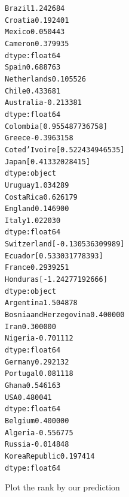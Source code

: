 \documentclass[letterpaper,10pt,english]{/usr/local/lib/python2.7/dist-packages/sphinx/texinputs/sphinxhowto}
\newenvironment{InvisibleVerbatim}
        {\begin{mdframed}[leftmargin=0.1\linewidth,innerleftmargin=3pt,innerrightmargin=3pt, userdefinedwidth=1\linewidth, linewidth=0pt, linecolor=white, usetwoside=false]}
        {\end{mdframed}}
\begin{document}
    

        
        

            
                \begin{InvisibleVerbatim}
                \vspace{-0.5\baselineskip}
\begin{alltt}Brazil     1.242684
Croatia    0.192401
Mexico     0.050443
Cameron    0.379935
dtype: float64
Spain          0.688763
Netherlands    0.105526
Chile          0.433681
Australia     -0.213381
dtype: float64
Colombia         [0.955487736758]
Greece                 -0.3963158
Cote d'Ivoire    [0.522434946535]
Japan             [0.41332028415]
dtype: object
Uruguay       1.034289
Costa Rica    0.626179
England       0.146900
Italy         1.022030
dtype: float64
Switzerland    [-0.130536309989]
Ecuador         [0.533031778393]
France                 0.2939251
Honduras        [-1.24277192666]
dtype: object
Argentina                 1.504878
Bosnia and Herzegovina    0.400000
Iran                      0.300000
Nigeria                  -0.701112
dtype: float64
Germany     0.292132
Portugal    0.081118
Ghana       0.546163
USA         0.480041
dtype: float64
Belgium           0.400000
Algeria          -0.556775
Russia           -0.014848
Korea Republic    0.197414
dtype: float64
\end{alltt}

            \end{InvisibleVerbatim}
            
        
    
Plot the rank by our prediction

\end{document}
